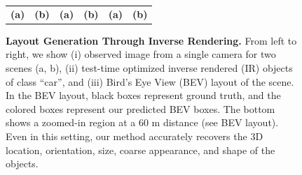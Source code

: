 \begin{figure}[t!]
{\begin{tabular}{@{}c@{\hskip .1cm}c@{\hskip .1cm}c@{\hskip .1cm}c@{\hskip .1cm}c@{\hskip .1cm}c@{}}
     \textbf{\large (a)} & \textbf{\large (b)} & \textbf{\large (a)} & \textbf{\large (b)} & \textbf{\large (a)} & \textbf{\large (b)} \\
    \end{tabular}}
    \vspace*{-6pt}
\caption{\textbf{Layout Generation Through Inverse Rendering.} From left to right, we show (i) observed image from a single camera for two scenes (a, b), (ii) test-time optimized inverse rendered (IR) objects of class ``car'', and (iii) Bird's Eye View (BEV) layout of the scene. In the BEV layout, black boxes represent ground truth, and the colored boxes represent our predicted BEV boxes. The bottom shows a zoomed-in region at a 60 m distance (see BEV layout). Even in this setting, our method accurately recovers the 3D location, orientation, size, coarse appearance, and shape of the objects.} 
\label{fig:BEV3D_fig}
\vspace*{-16pt}
\end{figure}

